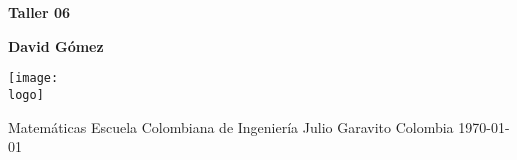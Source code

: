 \documentclass{article}
\newcommand{\logo}{C:/Users/usuario/Documents/U/logo-eci.jpg}
\newcommand{\titlename}{Taller 06}%
\begin{document}

\begin{titlepage}
    \begin{center}
        \vspace*{1cm}

        \textbf{\Huge{\titlename}}

        \vspace{1.5cm}

        \textbf{\large{David Gómez}}

        \vspace{4cm}

        \texttt{[image: \\logo]}

        \vspace{5cm}

        Matemáticas\linebreak
        Escuela Colombiana de Ingeniería Julio Garavito\linebreak
        Colombia\linebreak
        \today

    \end{center}
\end{titlepage}
\clearpage
\tableofcontents
\clearpage
\end{document}
